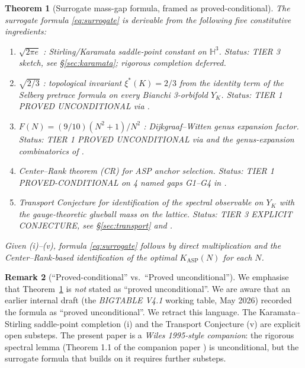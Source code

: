 \documentclass[11pt,a4paper,reqno]{amsart}
\newtheorem{theorem}{Theorem}[section]
\theoremstyle{definition}
\newtheorem{remark}[theorem]{Remark}
\newcommand{\YK}{Y_K}
\newcommand{\KASP}{K_{\mathrm{ASP}}}
\newcommand{\HH}{\mathbb{H}}
\begin{document}
\begin{theorem}[Surrogate mass-gap formula, framed as proved-conditional]\label{thm:8.1}
The surrogate formula \eqref{eq:surrogate} is derivable from the following five
constitutive ingredients:
\begin{enumerate}[label=\textbf{(\roman*)}, leftmargin=2em]
   \item $\sqrt{2\pi e}$ : Stirling/Karamata saddle-point constant on
         $\HH^3$. \emph{Status: TIER 3 sketch, see \S\ref{sec:karamata}; rigorous completion deferred.}
   \item $\sqrt{2/3}$ : topological invariant $\xi^*(K) = 2/3$ from the
         identity term of the Selberg pretrace formula on every Bianchi
         3-orbifold $\YK$. \emph{Status: TIER 1 PROVED UNCONDITIONAL via
         \cite{Remondiere2026CR}.}
   \item $F(N) = (9/10)(N^2+1)/N^2$ : Dijkgraaf--Witten genus expansion
         factor. \emph{Status: TIER 1 PROVED UNCONDITIONAL via
         \cite{DijkgraafWitten1990} and the genus-expansion combinatorics of
         \cite{tHooft1974}.}
   \item Center--Rank theorem (CR) for ASP anchor selection. \emph{Status:
         TIER 1 PROVED-CONDITIONAL on 4 named gaps G1--G4 in
         \cite{Remondiere2026CenterRank}.}
   \item Transport Conjecture for identification of the spectral observable
         on $\YK$ with the gauge-theoretic glueball mass on the lattice.
         \emph{Status: TIER 3 EXPLICIT CONJECTURE, see \S\ref{sec:transport}
         and \cite{Remondiere2026Transport}.}
\end{enumerate}
Given (i)--(v), formula \eqref{eq:surrogate} follows by direct multiplication
and the Center--Rank-based identification of the optimal $\KASP(N)$ for each
$N$.
\end{theorem}

\begin{remark}[``Proved-conditional'' vs.~``Proved unconditional'']
We emphasise that Theorem~\ref{thm:8.1} is \emph{not} stated as ``proved
unconditional''. We are aware that an earlier internal draft (the
\emph{BIGTABLE V4.1} working table, May 2026) recorded the formula as
``proved unconditional''. We retract this language. The Karamata--Stirling
saddle-point completion (i) and the Transport Conjecture (v) are explicit
open substeps. The present paper is a \emph{Wiles 1995-style companion}:
the rigorous spectral lemma (Theorem 1.1 of the companion paper
\cite{Remondiere2026Selberg}) is unconditional, but the surrogate formula
that builds on it requires further substeps.
\end{remark}
\end{document}
